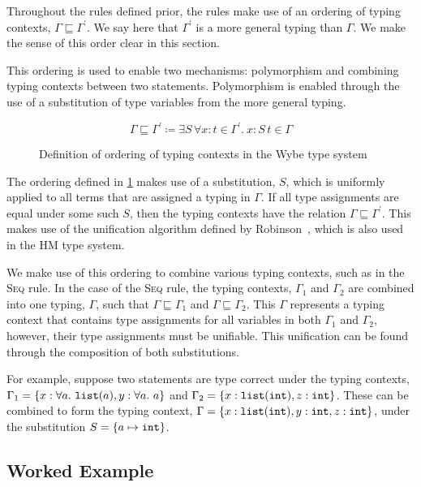 Throughout the rules defined prior, the rules make use of an ordering of typing contexts, $\Gamma \sqsubseteq \Gamma^\prime$. We say here that $\Gamma^\prime$ is a more general typing than $\Gamma$. We make the sense of this order clear in this section.

This ordering is used to enable two mechanisms: polymorphism and combining typing contexts between two statements. Polymorphism is enabled through the use of a substitution of type variables from the more general typing. 

\begin{figure}[ht]
  \[
    \Gamma \sqsubseteq \Gamma^\prime \coloneqq \exists S\, \forall x:t \in \Gamma^\prime.\ x:S\,t \in \Gamma
  \]
  \caption{Definition of ordering of typing contexts in the Wybe type system}
  \label{fig:type-context-order}
\end{figure}

The ordering defined in \cref{fig:type-context-order} makes use of a substitution, $S$, which is uniformly applied to all terms that are assigned a typing in $\Gamma$. If all type assignments are equal under some such $S$, then the typing contexts have the relation $\Gamma \sqsubseteq \Gamma^\prime$. This makes use of the unification algorithm defined by Robinson~\cite{robinson1965machine}, which is also used in the HM type system.

We make use of this ordering to combine various typing contexts, such as in the \textsc{Seq} rule. In the case of the \textsc{Seq} rule, the typing contexts, $\Gamma_1$ and $\Gamma_2$ are combined into one typing, $\Gamma$, such that $\Gamma \sqsubseteq \Gamma_1$ and $\Gamma \sqsubseteq \Gamma_2$. This $\Gamma$ represents a typing context that contains type assignments for all variables in both $\Gamma_1$ and $\Gamma_2$, however, their type assignments must be unifiable. This unification can be found through the composition of both substitutions.

For example, suppose two statements are type correct under the typing contexts, $\Gamma_1 = \set{x:\forall a.\ \mathtt{list}(a), y:\forall a.\ a}$ and $\Gamma_2 = \lbrace x:\mathtt{list}(\mathtt{int}), z:\mathtt{int}\rbrace$. These can be combined to form the typing context, $\Gamma = \lbrace x:\mathtt{list}(\mathtt{int}), y:\mathtt{int}, z:\mathtt{int}\rbrace$, under the substitution $S = \lbrace a \mapsto \mathtt{int}\rbrace$.

\subsection{Worked Example}
\label{sec:wybe-type-proof}

